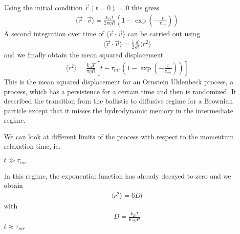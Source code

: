 \documentclass[letterpaper,10pt,english]{sphinxmanual}
\begin{document}
\sphinxAtStartPar
Using the initial condition \(\vec{r}(t=0)=0\) this gives
\begin{equation*}
\begin{split}\langle \vec{r}\cdot \vec{v}\rangle =\frac{k_B T}{2\pi\eta R}\left (1 -\exp\left ( -\frac{t}{\tau_{mr}}\right)\right)\end{split}
\end{equation*}
\sphinxAtStartPar
A second integration over time of \(\langle \vec{r}\cdot \vec{v}\rangle\) can be carried out using
\begin{equation*}
\begin{split}\langle \vec{r}\cdot \vec{v}\rangle=\frac{1}{2}\frac{d}{dt}\langle r^2\rangle\end{split}
\end{equation*}
\sphinxAtStartPar
and we finally obtain the mean squared displacement
\begin{equation*}
\begin{split}\langle r^2\rangle =\frac{k_B T}{\pi \eta R}\left [ t-\tau_{mr}\left ( 1-\exp\left (-\frac{t}{\tau_{mr}}\right )\right )\right ]\end{split}
\end{equation*}
\sphinxAtStartPar
This is the mean squared displacement for an Ornstein Uhlenbeck process, a process, which has a persistence for a certain time and then is randomized. It described the transition from the ballistic to diffusive regime for a Brownian particle except that it misses the hydrodynamic memory in the intermediate regime.

\noindent{}

\sphinxAtStartPar
We can look at different limits of the process with respect to the momentum relaxation time, ie.

\sphinxAtStartPar
{} \(t\gg \tau_{mr}\)

\sphinxAtStartPar
In this regime, the exponential function has already decayed to zero and we obtain
\begin{equation*}
\begin{split}\langle r^{2}\rangle =6Dt\end{split}
\end{equation*}
\sphinxAtStartPar
with
\begin{equation*}
\begin{split}D=\frac{k_B T}{6\pi\eta R}\end{split}
\end{equation*}
\sphinxAtStartPar
{} \(t\approx \tau_{mr}\)
\end{document}
